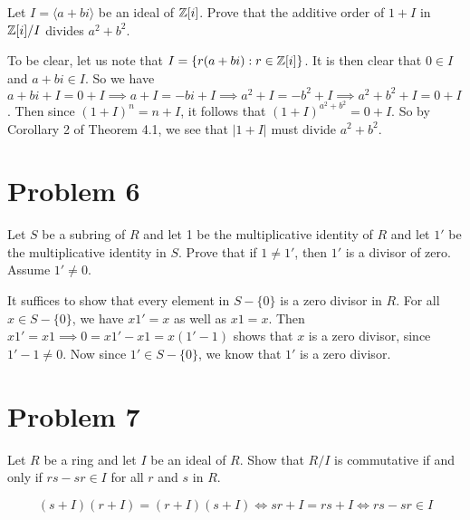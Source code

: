 \documentclass{article}
\begin{document}
Let $I=\langle a+bi\rangle$ be an ideal of $\mathbb{Z}[i]$.  Prove that the
additive order of $1+I$ in $\mathbb{Z}[i]/I$ divides $a^2+b^2$.

To be clear, let us note that $I=\{r(a+bi):r\in\mathbb{Z}[i]\}$.
It is then clear that $0\in I$ and $a+bi\in I$.
So we have $a+bi+I=0+I\implies a+I=-bi+I\implies a^2+I=-b^2+I\implies a^2+b^2+I=0+I$.
Then since $(1+I)^n=n+I$, it follows that $(1+I)^{a^2+b^2}=0+I$.
So by Corollary 2 of Theorem 4.1, we see that $|1+I|$ must divide $a^2+b^2$.

\section*{Problem 6}

Let $S$ be a subring of $R$ and let 1 be the multiplicative identity of $R$
and let $1'$ be the multiplicative identity in $S$.  Prove that if $1\neq 1'$,
then $1'$ is a divisor of zero.  Assume $1'\neq 0$.

It suffices to show that every element in $S-\{0\}$ is a zero divisor in $R$.
For all $x\in S-\{0\}$, we have $x1'=x$ as well as $x1=x$.
Then $x1'=x1\implies 0=x1'-x1=x(1'-1)$ shows that $x$ is a zero divisor,
since $1'-1\neq 0$.  Now since $1'\in S-\{0\}$, we know that $1'$ is a
zero divisor.

\section*{Problem 7}

Let $R$ be a ring and let $I$ be an ideal of $R$.  Show that $R/I$
is commutative if and only if $rs-sr\in I$ for all $r$ and $s$ in $R$.

\begin{equation*}
(s+I)(r+I)=(r+I)(s+I)\iff sr+I=rs+I\iff rs-sr\in I
\end{equation*}
\end{document}
